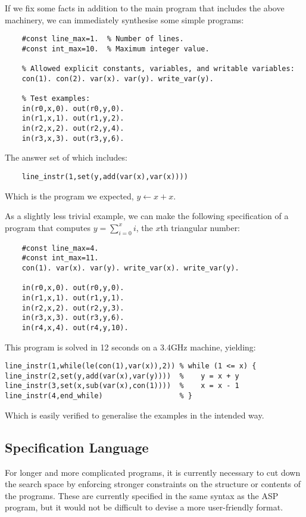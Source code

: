 \documentclass[a4paper,twoside,notitlepage]{article}
\begin{document}
If we fix some facts in addition to the main program that includes the 
above machinery, we can immediately synthesise some simple programs:
\begin{verbatim}
    #const line_max=1.  % Number of lines.
    #const int_max=10.  % Maximum integer value.

    % Allowed explicit constants, variables, and writable variables:
    con(1). con(2). var(x). var(y). write_var(y).
    
    % Test examples:
    in(r0,x,0). out(r0,y,0).
    in(r1,x,1). out(r1,y,2).
    in(r2,x,2). out(r2,y,4).
    in(r3,x,3). out(r3,y,6).
\end{verbatim}
The answer set of which includes:
\begin{verbatim}
    line_instr(1,set(y,add(var(x),var(x))))
\end{verbatim}
Which is the program we expected, $y \gets x + x$.

As a slightly less trivial example, we can make the following 
specification of a program that computes $y = \sum_{i=0}^x i$, the $x$th 
triangular number:
\begin{verbatim}
    #const line_max=4.
    #const int_max=11. 
    con(1). var(x). var(y). write_var(x). write_var(y).
    
    in(r0,x,0). out(r0,y,0).
    in(r1,x,1). out(r1,y,1).
    in(r2,x,2). out(r2,y,3).
    in(r3,x,3). out(r3,y,6).
    in(r4,x,4). out(r4,y,10).
\end{verbatim}
This program is solved in 12 seconds on a 3.4GHz machine, yielding:
\begin{verbatim}
line_instr(1,while(le(con(1),var(x)),2)) % while (1 <= x) {
line_instr(2,set(y,add(var(x),var(y))))  %    y = x + y
line_instr(3,set(x,sub(var(x),con(1))))  %    x = x - 1
line_instr(4,end_while)                  % }
\end{verbatim}
Which is easily verified to generalise the examples in the intended way.

\subsection{Specification Language} \label{sec:inplng}
For longer and more complicated programs, it is currently necessary to cut 
down the search space by enforcing stronger constraints on the structure 
or contents of the programs. These are currently specified in the same 
syntax as the ASP program, but it would not be difficult to devise a more 
user-friendly format.
\end{document}

